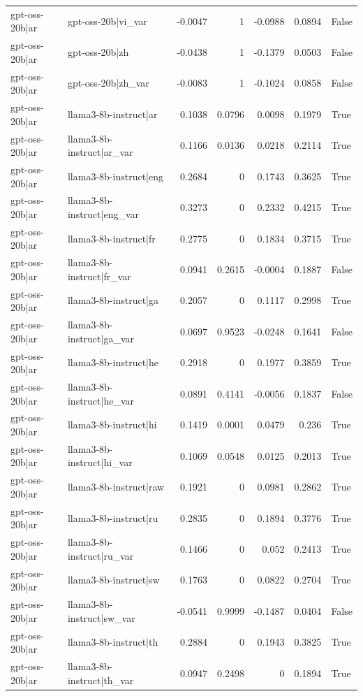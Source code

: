 \begin{table}
\begin{tabular}{l l r r r r l}
gpt-oss-20b|ar & gpt-oss-20b|vi_var & -0.0047 & 1 & -0.0988 & 0.0894 & False \\
gpt-oss-20b|ar & gpt-oss-20b|zh & -0.0438 & 1 & -0.1379 & 0.0503 & False \\
gpt-oss-20b|ar & gpt-oss-20b|zh_var & -0.0083 & 1 & -0.1024 & 0.0858 & False \\
gpt-oss-20b|ar & llama3-8b-instruct|ar & 0.1038 & 0.0796 & 0.0098 & 0.1979 & True \\
gpt-oss-20b|ar & llama3-8b-instruct|ar_var & 0.1166 & 0.0136 & 0.0218 & 0.2114 & True \\
gpt-oss-20b|ar & llama3-8b-instruct|eng & 0.2684 & 0 & 0.1743 & 0.3625 & True \\
gpt-oss-20b|ar & llama3-8b-instruct|eng_var & 0.3273 & 0 & 0.2332 & 0.4215 & True \\
gpt-oss-20b|ar & llama3-8b-instruct|fr & 0.2775 & 0 & 0.1834 & 0.3715 & True \\
gpt-oss-20b|ar & llama3-8b-instruct|fr_var & 0.0941 & 0.2615 & -0.0004 & 0.1887 & False \\
gpt-oss-20b|ar & llama3-8b-instruct|ga & 0.2057 & 0 & 0.1117 & 0.2998 & True \\
gpt-oss-20b|ar & llama3-8b-instruct|ga_var & 0.0697 & 0.9523 & -0.0248 & 0.1641 & False \\
gpt-oss-20b|ar & llama3-8b-instruct|he & 0.2918 & 0 & 0.1977 & 0.3859 & True \\
gpt-oss-20b|ar & llama3-8b-instruct|he_var & 0.0891 & 0.4141 & -0.0056 & 0.1837 & False \\
gpt-oss-20b|ar & llama3-8b-instruct|hi & 0.1419 & 0.0001 & 0.0479 & 0.236 & True \\
gpt-oss-20b|ar & llama3-8b-instruct|hi_var & 0.1069 & 0.0548 & 0.0125 & 0.2013 & True \\
gpt-oss-20b|ar & llama3-8b-instruct|raw & 0.1921 & 0 & 0.0981 & 0.2862 & True \\
gpt-oss-20b|ar & llama3-8b-instruct|ru & 0.2835 & 0 & 0.1894 & 0.3776 & True \\
gpt-oss-20b|ar & llama3-8b-instruct|ru_var & 0.1466 & 0 & 0.052 & 0.2413 & True \\
gpt-oss-20b|ar & llama3-8b-instruct|sw & 0.1763 & 0 & 0.0822 & 0.2704 & True \\
gpt-oss-20b|ar & llama3-8b-instruct|sw_var & -0.0541 & 0.9999 & -0.1487 & 0.0404 & False \\
gpt-oss-20b|ar & llama3-8b-instruct|th & 0.2884 & 0 & 0.1943 & 0.3825 & True \\
gpt-oss-20b|ar & llama3-8b-instruct|th_var & 0.0947 & 0.2498 & 0 & 0.1894 & True \\

\end{tabular}
\end{table}
